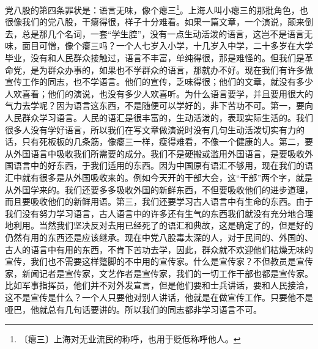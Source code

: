 \documentclass[12pt,UTF-8,openany]{ctexbook}
\begin{document}
\begin{large}
    党八股的第四条罪状是：语言无味，像个瘪三\footnote{〔瘪三〕上海对无业流民的称呼，也用于贬低称呼他人。}。上海人叫小瘪三的那批角色，也很像我们的党八股，干瘪得很，样子十分难看。如果一篇文章，一个演说，颠来倒去，总是那几个名词，一套“学生腔”，没有一点生动活泼的语言，这岂不是语言无味，面目可憎，像个瘪三吗？一个人七岁入小学，十几岁入中学，二十多岁在大学毕业，没有和人民群众接触过，语言不丰富，单纯得很，那是难怪的。但我们是革命党，是为群众办事的，如果也不学群众的语言，那就办不好。现在我们有许多做宣传工作的同志，也不学语言。他们的宣传，乏味得很；他们的文章，就没有多少人欢喜看；他们的演说，也没有多少人欢喜听。为什么语言要学，并且要用很大的气力去学呢？因为语言这东西，不是随便可以学好的，非下苦功不可。第一，要向人民群众学习语言。人民的语汇是很丰富的，生动活泼的，表现实际生活的。我们很多人没有学好语言，所以我们在写文章做演说时没有几句生动活泼切实有力的话，只有死板板的几条筋，像瘪三一样，瘦得难看，不像一个健康的人。第二，要从外国语言中吸收我们所需要的成分。我们不是硬搬或滥用外国语言，是要吸收外国语言中的好东西，于我们适用的东西。因为中国原有语汇不够用，现在我们的语汇中就有很多是从外国吸收来的。例如今天开的干部大会，这“干部”两个字，就是从外国学来的。我们还要多多吸收外国的新鲜东西，不但要吸收他们的进步道理，而且要吸收他们的新鲜用语。第三，我们还要学习古人语言中有生命的东西。由于我们没有努力学习语言，古人语言中的许多还有生气的东西我们就没有充分地合理地利用。当然我们坚决反对去用已经死了的语汇和典故，这是确定了的，但是好的仍然有用的东西还是应该继承。现在中党八股毒太深的人，对于民间的、外国的、古人的语言中有用的东西，不肯下苦功去学，因此，群众就不欢迎他们枯燥无味的宣传，我们也不需要这样蹩脚的不中用的宣传家。什么是宣传家？不但教员是宣传家，新闻记者是宣传家，文艺作者是宣传家，我们的一切工作干部也都是宣传家。比如军事指挥员，他们并不对外发宣言，但是他们要和士兵讲话，要和人民接洽，这不是宣传是什么？一个人只要他对别人讲话，他就是在做宣传工作。只要他不是哑巴，他就总有几句话要讲的。所以我们的同志都非学习语言不可。
    

\end{large}
\end{document}
